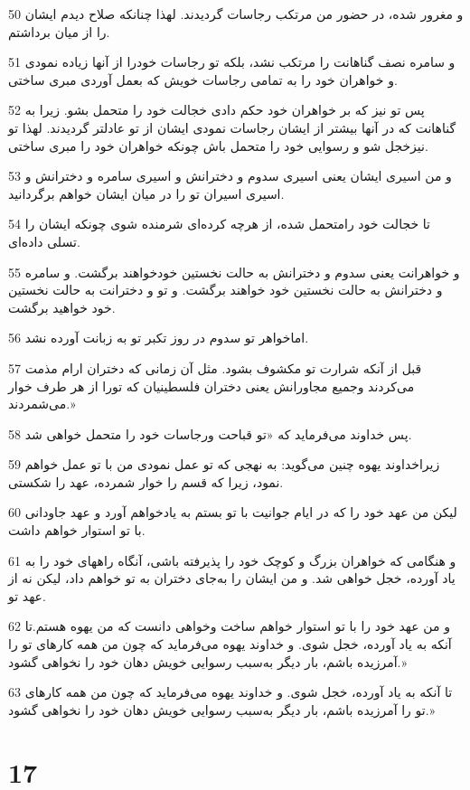\par 50 و مغرور شده، در حضور من مرتکب رجاسات گردیدند. لهذا چنانکه صلاح دیدم ایشان را از میان برداشتم.
\par 51 و سامره نصف گناهانت را مرتکب نشد، بلکه تو رجاسات خودرا از آنها زیاده نمودی و خواهران خود را به تمامی رجاسات خویش که بعمل آوردی مبری ساختی.
\par 52 پس تو نیز که بر خواهران خود حکم دادی خجالت خود را متحمل بشو. زیرا به گناهانت که در آنها بیشتر از ایشان رجاسات نمودی ایشان از تو عادلتر گردیدند. لهذا تو نیزخجل شو و رسوایی خود را متحمل باش چونکه خواهران خود را مبری ساختی.
\par 53 و من اسیری ایشان یعنی اسیری سدوم و دخترانش و اسیری سامره و دخترانش و اسیری اسیران تو را در میان ایشان خواهم برگردانید.
\par 54 تا خجالت خود رامتحمل شده، از هر‌چه کرده‌ای شرمنده شوی چونکه ایشان را تسلی داده‌ای.
\par 55 و خواهرانت یعنی سدوم و دخترانش به حالت نخستین خودخواهند برگشت. و سامره و دخترانش به حالت نخستین خود خواهند برگشت. و تو و دخترانت به حالت نخستین خود خواهید برگشت.
\par 56 اماخواهر تو سدوم در روز تکبر تو به زبانت آورده نشد.
\par 57 قبل از آنکه شرارت تو مکشوف بشود. مثل آن زمانی که دختران ارام مذمت می‌کردند وجمیع مجاورانش یعنی دختران فلسطینیان که تورا از هر طرف خوار می‌شمردند.»
\par 58 پس خداوند می‌فرماید که «تو قباحت ورجاسات خود را متحمل خواهی شد.
\par 59 زیراخداوند یهوه چنین می‌گوید: به نهجی که تو عمل نمودی من با تو عمل خواهم نمود، زیرا که قسم را خوار شمرده، عهد را شکستی.
\par 60 لیکن من عهد خود را که در ایام جوانیت با تو بستم به یادخواهم آورد و عهد جاودانی با تو استوار خواهم داشت.
\par 61 و هنگامی که خواهران بزرگ و کوچک خود را پذیرفته باشی، آنگاه راههای خود را به یاد آورده، خجل خواهی شد. و من ایشان را به‌جای دختران به تو خواهم داد، لیکن نه از عهد تو.
\par 62 و من عهد خود را با تو استوار خواهم ساخت وخواهی دانست که من یهوه هستم.تا آنکه به یاد آورده، خجل شوی. و خداوند یهوه می‌فرماید که چون من همه کارهای تو را آمرزیده باشم، بار دیگر به‌سبب رسوایی خویش دهان خود را نخواهی گشود.»
\par 63 تا آنکه به یاد آورده، خجل شوی. و خداوند یهوه می‌فرماید که چون من همه کارهای تو را آمرزیده باشم، بار دیگر به‌سبب رسوایی خویش دهان خود را نخواهی گشود.»

\chapter{17}

